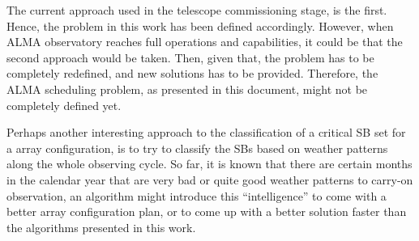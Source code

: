 The current approach used in the telescope commissioning stage, is the first. Hence, the problem in this work has been defined accordingly. However, when ALMA observatory reaches full operations and capabilities, it could be that the second approach would be taken. Then, given that, the problem has to be completely redefined, and new solutions has to be provided. Therefore, the ALMA scheduling problem, as presented in this document, might not be completely defined yet.

Perhaps another interesting approach to the classification of a critical SB set for a array configuration, is to try to classify the SBs based on weather patterns along the whole observing cycle. So far, it is known that there are certain months in the calendar year that are very bad or quite good weather patterns to carry-on observation, an algorithm might introduce this ``intelligence'' to come with a better array configuration plan, or to come up with a better solution faster than the algorithms presented in this work.